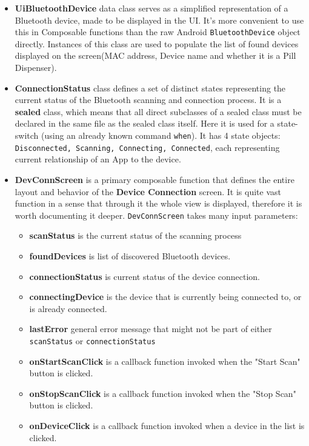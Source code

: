 \begin{itemize}
	\item \textbf{UiBluetoothDevice} data class serves as a simplified representation of a Bluetooth device, made to be displayed in the \ac{UI}. It's more convenient to use this in Composable functions than the raw Android \texttt{BluetoothDevice} object directly. Instances of this class are used to populate the list of found devices displayed on the screen(\ac{MAC} address, Device name and whether it is a Pill Dispenser).
	\item \textbf{ConnectionStatus} class defines a set of distinct states representing the current status of the Bluetooth scanning and connection process. It is a \textbf{sealed} class, which means that all direct subclasses of a sealed class must be declared in the same file as the sealed class itself. Here it is used for a state-switch (using an already known command \texttt{when}). It has 4 state objects: \texttt{Disconnected, Scanning, Connecting, Connected}, each representing current relationship of an App to the device.
	\item \textbf{DevConnScreen} is a primary composable function that defines the entire layout and behavior of the \textbf{Device Connection} screen. It is quite vast function in a sense that through it the whole view is displayed, therefore it is worth documenting it deeper. \texttt{DevConnScreen} takes many input parameters:
	\begin{itemize}
		\item \textbf{scanStatus} is the current status of the scanning process
		\item \textbf{foundDevices} is list of discovered Bluetooth devices.
		\item \textbf{connectionStatus} is current status of the device connection.
		\item \textbf{connectingDevice} is the device that is currently being connected to, or is already connected.
		\item \textbf{lastError} general error message that might not be part of either  \texttt{scanStatus} or \texttt{connectionStatus}
		\item \textbf{onStartScanClick} is a callback function invoked when the "Start Scan" button is clicked.
		\item \textbf{onStopScanClick} is a callback function invoked when the "Stop Scan" button is clicked.
		\item \textbf{onDeviceClick} is a callback function invoked when a device in the list is clicked.

\end{itemize}
\end{itemize}
